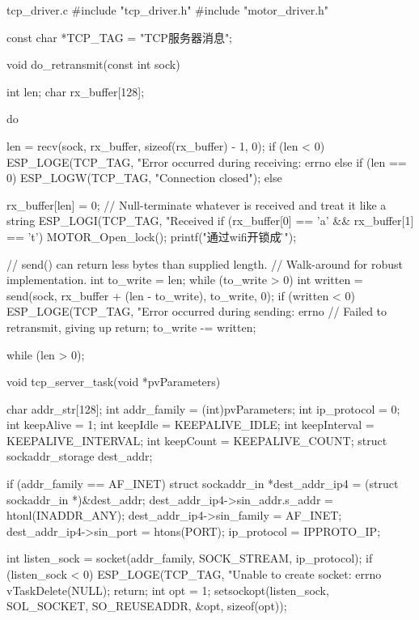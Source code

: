 \documentclass[lang=cn,newtx,10pt,scheme=chinese]{elegantbook}
\begin{document}
\begin{mycode}{tcp\_driver.c}
#include "tcp_driver.h"
#include "motor_driver.h"

const char *TCP_TAG = "TCP服务器消息";

void do_retransmit(const int sock)
{
    int len;
    char rx_buffer[128];

    do
    {
        len = recv(sock, rx_buffer, sizeof(rx_buffer) - 1, 0);
        if (len < 0)
        {
            ESP_LOGE(TCP_TAG, "Error occurred during receiving: errno %
        }
        else if (len == 0)
        {
            ESP_LOGW(TCP_TAG, "Connection closed");
        }
        else
        {
            rx_buffer[len] = 0; // Null-terminate whatever is received and treat it like a string
            ESP_LOGI(TCP_TAG, "Received %
            if (rx_buffer[0] == 'a' && rx_buffer[1] == 't') {
                MOTOR_Open_lock();
                printf("通过wifi开锁成功\r\n");
            }

            // send() can return less bytes than supplied length.
            // Walk-around for robust implementation.
            int to_write = len;
            while (to_write > 0)
            {
                int written = send(sock, rx_buffer + (len - to_write), to_write, 0);
                if (written < 0)
                {
                    ESP_LOGE(TCP_TAG, "Error occurred during sending: errno %
                    // Failed to retransmit, giving up
                    return;
                }
                to_write -= written;
            }
        }
    } while (len > 0);
}

void tcp_server_task(void *pvParameters)
{
    char addr_str[128];
    int addr_family = (int)pvParameters;
    int ip_protocol = 0;
    int keepAlive = 1;
    int keepIdle = KEEPALIVE_IDLE;
    int keepInterval = KEEPALIVE_INTERVAL;
    int keepCount = KEEPALIVE_COUNT;
    struct sockaddr_storage dest_addr;

    if (addr_family == AF_INET)
    {
        struct sockaddr_in *dest_addr_ip4 = (struct sockaddr_in *)&dest_addr;
        dest_addr_ip4->sin_addr.s_addr = htonl(INADDR_ANY);
        dest_addr_ip4->sin_family = AF_INET;
        dest_addr_ip4->sin_port = htons(PORT);
        ip_protocol = IPPROTO_IP;
    }

    int listen_sock = socket(addr_family, SOCK_STREAM, ip_protocol);
    if (listen_sock < 0)
    {
        ESP_LOGE(TCP_TAG, "Unable to create socket: errno %
        vTaskDelete(NULL);
        return;
    }
    int opt = 1;
    setsockopt(listen_sock, SOL_SOCKET, SO_REUSEADDR, &opt, sizeof(opt));

}
\end{mycode}
\end{document}

